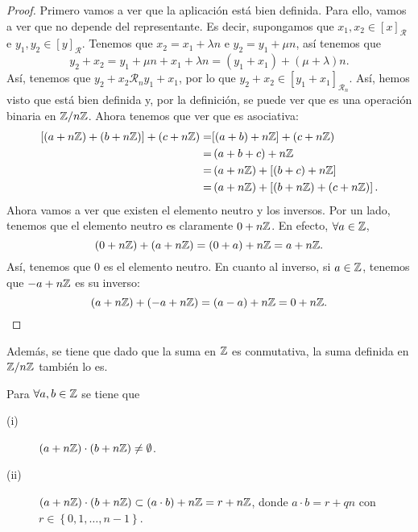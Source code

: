 \begin{proof}
	Primero vamos a ver que la aplicación está bien definida. Para ello, vamos a ver que no depende del representante. Es decir, supongamos que $\displaystyle x_{1}, x_{2} \in [x]_{\mathcal{R}}$ e $\displaystyle y_{1}, y_{2} \in [y]_{\mathcal{R}} $. Tenemos que $\displaystyle x_{2} = x_{1} + \lambda n $ e $\displaystyle y_{2} = y_{1} + \mu n $, así tenemos que
	\[y_{2}+x_{2}=y_{1}+\mu n + x_{1} + \lambda n = \left(y_{1}+x_{1}\right) + \left(\mu + \lambda \right)n .\]
	Así, tenemos que $\displaystyle y_{2}+x_{2} \mathcal{R}_{n} y_{1}+x_{1} $, por lo que $\displaystyle y_{2}+x_{2} \in [y_{1}+x_{1}]_{\mathcal{R}_{n}} $. Así, hemos visto que está bien definida y, por la definición, se puede ver que es una operación binaria en $\displaystyle \mathbb{Z}/n\mathbb{Z} $. Ahora tenemos que ver que es asociativa:
	\[
	\begin{split}
		[\left(a +n\mathbb{Z}\right)+\left(b+n\mathbb{Z}\right)] + \left(c + n\mathbb{Z}\right) = & [\left(a+b\right)+n\mathbb{Z}] + \left(c + n\mathbb{Z}\right) \\
		= & \left(a+b+c\right) + n\mathbb{Z} \\
		= & \left(a+n\mathbb{Z}\right)+[\left(b+c\right)+n\mathbb{Z}] \\
		= & \left(a+n\mathbb{Z}\right)+\left[\left(b+n\mathbb{Z}\right)+\left(c+n\mathbb{Z}\right)\right] .
	\end{split}
	\]
Ahora vamos a ver que existen el elemento neutro y los inversos. Por un lado, tenemos que el elemento neutro es claramente $\displaystyle 0 + n\mathbb{Z} $. En efecto, $\displaystyle \forall a \in \mathbb{Z} $, 
\[\left(0 + n\mathbb{Z}\right) + \left(a + n\mathbb{Z}\right) = \left(0 + a\right) + n\mathbb{Z} = a + n\mathbb{Z} .\]
Así, tenemos que $\displaystyle 0 $ es el elemento neutro. En cuanto al inverso, si $\displaystyle a \in \mathbb{Z} $, tenemos que $\displaystyle -a + n\mathbb{Z} $ es su inverso:
\[\left(a + n\mathbb{Z}\right) + \left(-a+n\mathbb{Z}\right) = \left(a - a\right)+n\mathbb{Z} = 0 + n\mathbb{Z} .\]
\end{proof}
\begin{observation}
Además, se tiene que dado que la suma en $\displaystyle \mathbb{Z} $ es conmutativa, la suma definida en $\displaystyle \mathbb{Z}/n\mathbb{Z} $ también lo es.
\end{observation}
\begin{prop} Para $\displaystyle \forall a,b \in \mathbb{Z} $ se tiene que
\begin{description}
\item[(i)] $\displaystyle \left(a + n\mathbb{Z}\right) \cdot \left(b + n\mathbb{Z}\right) \neq \emptyset $.
\item[(ii)] $\displaystyle \left(a + n\mathbb{Z}\right) \cdot \left(b + n\mathbb{Z}\right) \subset \left(a \cdot b\right)+n\mathbb{Z} = r + n\mathbb{Z} $, donde $\displaystyle a \cdot b = r + qn $ con $\displaystyle r \in \left\{ 0, 1, \ldots, n - 1\right\}  $.
\end{description}
\end{prop}
